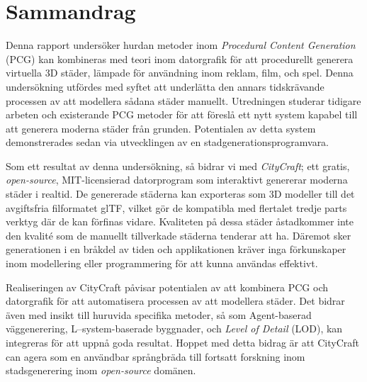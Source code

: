 \chapter*{Sammandrag}

Denna rapport undersöker hurdan metoder inom \textit{Procedural Content Generation} (PCG) kan kombineras med teori inom datorgrafik för att procedurellt generera virtuella 3D städer, lämpade för användning inom reklam, film, och spel.
Denna undersökning utfördes med syftet att underlätta den annars tidskrävande processen av att modellera sådana städer manuellt.
Utredningen studerar tidigare arbeten och existerande PCG metoder för att föreslå ett nytt system kapabel till att generera moderna städer från grunden.
Potentialen av detta system demonstrerades sedan via utvecklingen av en stadgenerationsprogramvara.

Som ett resultat av denna undersökning, så bidrar vi med \textit{CityCraft}; ett gratis, \textit{open-source}, MIT-licensierad datorprogram som interaktivt genererar moderna städer i realtid.
De genererade städerna kan exporteras som 3D modeller till det avgiftsfria filformatet glTF, vilket gör de kompatibla med flertalet tredje parts verktyg där de kan förfinas vidare.
Kvaliteten på dessa städer åstadkommer inte den kvalité som de manuellt tillverkade städerna tenderar att ha.
Däremot sker generationen i en bråkdel av tiden och applikationen kräver inga förkunskaper inom modellering eller programmering för att kunna användas effektivt.

Realiseringen av CityCraft påvisar potentialen av att kombinera PCG och datorgrafik för att automatisera processen av att modellera städer.
Det bidrar även med insikt till huruvida specifika metoder, så som Agent-baserad väggenerering, L--system-baserade byggnader, och \textit{Level of Detail} (LOD), kan integreras för att uppnå goda resultat.
Hoppet med detta bidrag är att CityCraft can agera som en användbar språngbräda till fortsatt forskning inom stadsgenerering inom \textit{open-source} domänen.